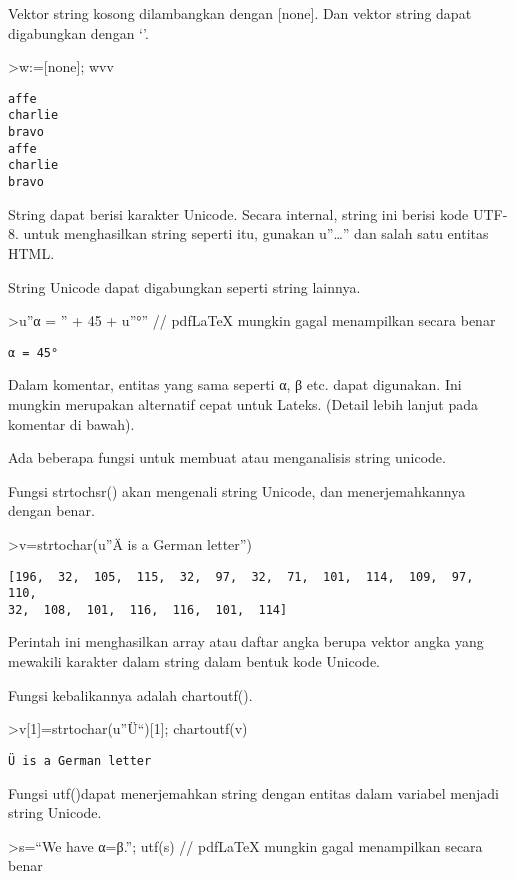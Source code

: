 \documentclass[
]{book}
\begin{document}
Vektor string kosong dilambangkan dengan {[}none{]}. Dan vektor string dapat digabungkan dengan `\textbar{}'.

\textgreater w:={[}none{]}; w\textbar v\textbar v

\begin{verbatim}
affe
charlie
bravo
affe
charlie
bravo
\end{verbatim}

String dapat berisi karakter Unicode. Secara internal, string ini berisi kode UTF-8. untuk menghasilkan string seperti itu, gunakan u''\ldots'' dan salah satu entitas HTML.

String Unicode dapat digabungkan seperti string lainnya.

\textgreater u''α = '' + 45 + u''°'' // pdfLaTeX mungkin gagal menampilkan secara benar

\begin{verbatim}
α = 45°
\end{verbatim}

Dalam komentar, entitas yang sama seperti α, β etc. dapat digunakan. Ini mungkin merupakan alternatif cepat untuk Lateks. (Detail lebih lanjut pada komentar di bawah).

Ada beberapa fungsi untuk membuat atau menganalisis string unicode.

Fungsi strtochsr() akan mengenali string Unicode, dan menerjemahkannya dengan benar.

\textgreater v=strtochar(u''Ä is a German letter'')

\begin{verbatim}
[196,  32,  105,  115,  32,  97,  32,  71,  101,  114,  109,  97,  110,
32,  108,  101,  116,  116,  101,  114]
\end{verbatim}

Perintah ini menghasilkan array atau daftar angka berupa vektor angka yang mewakili karakter dalam string dalam bentuk kode Unicode.

Fungsi kebalikannya adalah chartoutf().

\textgreater v{[}1{]}=strtochar(u''Ü``){[}1{]}; chartoutf(v)

\begin{verbatim}
Ü is a German letter
\end{verbatim}

Fungsi utf()dapat menerjemahkan string dengan entitas dalam variabel menjadi string Unicode.

\textgreater s=``We have α=β.''; utf(s) // pdfLaTeX mungkin gagal menampilkan secara benar
\end{document}

